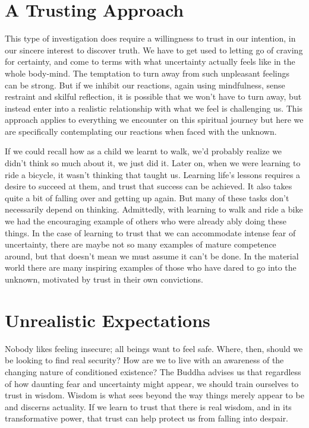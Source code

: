 \clearpage\mbox{}\thispagestyle{empty}
\clearpage

\section{A Trusting Approach}

This type of investigation does require a willingness to trust in our
intention, in our sincere interest to discover truth. We have to get
used to letting go of craving for certainty, and come to terms with what
uncertainty actually feels like in the whole body-mind. The temptation
to turn away from such unpleasant feelings can be strong. But if we
inhibit our reactions, again using mindfulness, sense restraint and
skilful reflection, it is possible that we won't have to turn away, but
instead enter into a realistic relationship with what we feel is
challenging us. This approach applies to everything we encounter on this
spiritual journey but here we are specifically contemplating our
reactions when faced with the unknown.

If we could recall how as a child we learnt to walk, we'd probably
realize we didn't think so much about it, we just did it. Later on, when
we were learning to ride a bicycle, it wasn't thinking that taught us.
Learning life's lessons requires a desire to succeed at them, and trust
that success can be achieved. It also takes quite a bit of falling over
and getting up again. But many of these tasks don't necessarily depend
on thinking. Admittedly, with learning to walk and ride a bike we had
the encouraging example of others who were already ably doing these
things. In the case of learning to trust that we can accommodate intense
fear of uncertainty, there are maybe not so many examples of mature
competence around, but that doesn't mean we must assume it can't be
done. In the material world there are many inspiring examples of those
who have dared to go into the unknown, motivated by trust in their own
convictions.

\section{Unrealistic Expectations}

Nobody likes feeling insecure; all beings want to feel safe. Where,
then, should we be looking to find real security? How are we to live
with an awareness of the changing nature of conditioned existence? The
Buddha advises us that regardless of how daunting fear and uncertainty
might appear, we should train ourselves to trust in wisdom. Wisdom is
what sees beyond the way things merely appear to be and discerns
actuality. If we learn to trust that there is real wisdom, and in its
transformative power, that trust can help protect us from falling into
despair.

